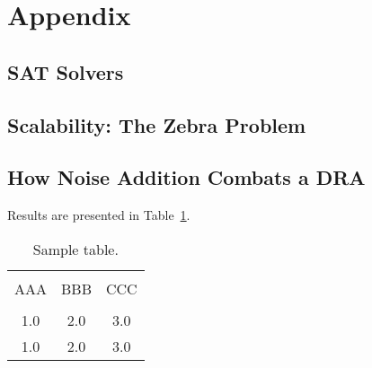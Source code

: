 \documentclass[jou,apacite]{apa6}
\begin{document}
\section{Appendix}

\subsection{SAT Solvers}

\subsection{Scalability: The Zebra Problem}

\subsection{How Noise Addition Combats a DRA}


Results are presented in Table~\ref{tab1}.
\begin{table}[!htb]
\caption{Sample table.}\label{tab1}
\begin{tabular}{ccc}
\hline\\[-1.5ex]
AAA & BBB & CCC \\[0.5ex]
\hline\\[-1.5ex]
1.0 & 2.0 & 3.0\\[0.5ex]
1.0 & 2.0 & 3.0\\[0.5ex]
\hline
\end{tabular}
\end{table}



\end{document}
